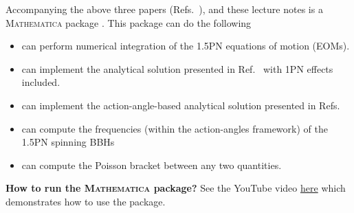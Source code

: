 Accompanying the above three papers (Refs.~\cite{tanay2021action, tanay2021integrability, Cho:2019brd}), and these lecture notes
is a \textsc{Mathematica} package \cite{MMA1}. This package can 
do the following
\begin{itemize}
\item can perform numerical integration of the 1.5PN equations of motion (EOMs).
\item can implement the analytical solution presented in Ref.~\cite{Cho:2019brd} with
1PN effects included.
\item can implement the action-angle-based analytical solution presented in
Refs.~\cite{tanay2021action, tanay2021integrability}
\item can compute the frequencies (within the action-angles framework) 
of the 1.5PN spinning BBHs
\item can compute the Poisson bracket between any two quantities.
\end{itemize}


\textbf{How to run the \textsc{Mathematica} package?} 
See the YouTube video \href{https://youtu.be/aoiCk5TtmvE}{here}
which demonstrates how to use the package.












